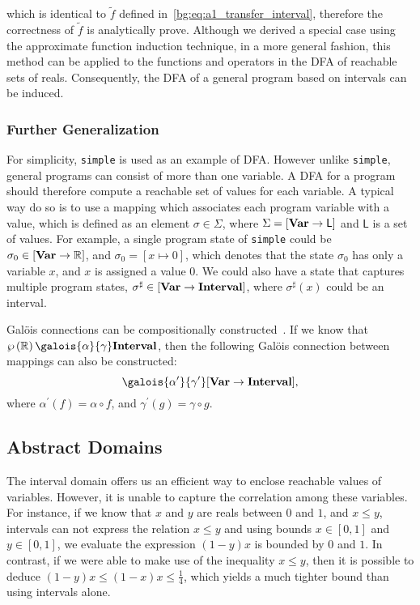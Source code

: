 which is identical to $\tilde{f}$ defined
in~\eqref{bg:eq:a1_transfer_interval}, therefore the correctness of $\tilde{f}$
is analytically prove.  Although we derived a special case using the
approximate function induction technique, in a more general fashion, this
method can be applied to the functions and operators in the DFA of reachable
sets of reals.  Consequently, the DFA of a general program based on intervals
can be induced.

\subsubsection{Further Generalization}

For simplicity, \verb|simple| is used as an example of DFA\@.  However unlike
\verb|simple|, general programs can consist of more than one variable.  A DFA
for a program should therefore compute a reachable set of values for each
variable.  A typical way do so is to use a mapping which associates each
program variable with a value, which is defined as an element $\sigma \in
\Sigma$, where $\Sigma = \left[\mathbf{Var} \to \mathsf{L}\right]$ and $\mathsf{L}$
is a set of values.  For example, a single program state of \verb|simple| could
be $\sigma_0 \in \left[\mathbf{Var} \to \mathbb{R}\right]$, and $\sigma_0 = [x \mapsto
0]$, which denotes that the state $\sigma_0$ has only a variable $x$, and $x$
is assigned a value $0$.  We could also have a state that captures multiple
program states, $\sigma^\sharp \in \left[\mathbf{Var} \to \mathbf{Interval}\right]$,
where $\sigma^\sharp(x)$ could be an interval.

Gal\"ois connections can be compositionally constructed~\cite{nielson99}.  If
we know that $\powersetof\realset \galois{\alpha}{\gamma} \intervalset$, then
the following Gal\"ois connection between mappings can also be constructed:
\begin{equation}
    [\varset \to \powersetof\realset]
        \galois{\alpha^\prime}{\gamma^\prime}
    [\varset \to \intervalset],
\end{equation}
where $\alpha^\prime(f) = \alpha \circ f$, and $\gamma^\prime(g) = \gamma \circ
g$.


\subsection{Abstract Domains}
\label{bg:sub:abstract_domains}

The interval domain offers us an efficient way to enclose reachable values
of variables.  However, it is unable to capture the correlation among these
variables.  For instance, if we know that $x$ and $y$ are reals between $0$
and $1$, and $x \leq y$, intervals can not express the relation $x \leq y$ and
using bounds $x \in [0, 1]$ and $y \in [0, 1]$, we evaluate the expression $(1
- y)x$ is bounded by $0$ and $1$.  In contrast, if we were able to make use of
the inequality $x \leq y$, then it is possible to deduce $(1 - y) x \leq (1 -
x) x \leq \frac{1}{4}$, which yields a much tighter bound than using intervals
alone.


